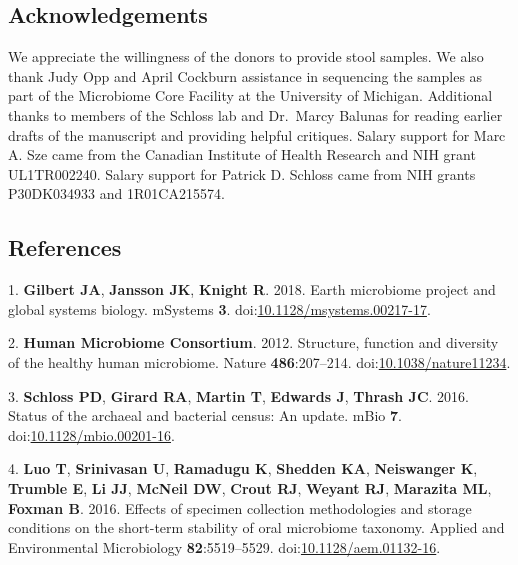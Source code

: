 \documentclass[11pt,]{article}
\begin{document}
\hypertarget{acknowledgements}{%
\subsection{Acknowledgements}\label{acknowledgements}}

We appreciate the willingness of the donors to provide stool samples. We
also thank Judy Opp and April Cockburn assistance in sequencing the
samples as part of the Microbiome Core Facility at the University of
Michigan. Additional thanks to members of the Schloss lab and Dr.~Marcy
Balunas for reading earlier drafts of the manuscript and providing
helpful critiques. Salary support for Marc A. Sze came from the Canadian
Institute of Health Research and NIH grant UL1TR002240. Salary support
for Patrick D. Schloss came from NIH grants P30DK034933 and
1R01CA215574.

\newpage

\hypertarget{references}{%
\subsection{References}\label{references}}

\hypertarget{refs}{}
\leavevmode\hypertarget{ref-Gilbert2018}{}%
1. \textbf{Gilbert JA}, \textbf{Jansson JK}, \textbf{Knight R}. 2018.
Earth microbiome project and global systems biology. mSystems
\textbf{3}.
doi:\href{https://doi.org/10.1128/msystems.00217-17}{10.1128/msystems.00217-17}.

\leavevmode\hypertarget{ref-HMP2012}{}%
2. \textbf{Human Microbiome Consortium}. 2012. Structure, function and
diversity of the healthy human microbiome. Nature \textbf{486}:207--214.
doi:\href{https://doi.org/10.1038/nature11234}{10.1038/nature11234}.

\leavevmode\hypertarget{ref-Schloss2016}{}%
3. \textbf{Schloss PD}, \textbf{Girard RA}, \textbf{Martin T},
\textbf{Edwards J}, \textbf{Thrash JC}. 2016. Status of the archaeal and
bacterial census: An update. mBio \textbf{7}.
doi:\href{https://doi.org/10.1128/mbio.00201-16}{10.1128/mbio.00201-16}.

\leavevmode\hypertarget{ref-Luo2016}{}%
4. \textbf{Luo T}, \textbf{Srinivasan U}, \textbf{Ramadugu K},
\textbf{Shedden KA}, \textbf{Neiswanger K}, \textbf{Trumble E},
\textbf{Li JJ}, \textbf{McNeil DW}, \textbf{Crout RJ}, \textbf{Weyant
RJ}, \textbf{Marazita ML}, \textbf{Foxman B}. 2016. Effects of specimen
collection methodologies and storage conditions on the short-term
stability of oral microbiome taxonomy. Applied and Environmental
Microbiology \textbf{82}:5519--5529.
doi:\href{https://doi.org/10.1128/aem.01132-16}{10.1128/aem.01132-16}.
\end{document}
